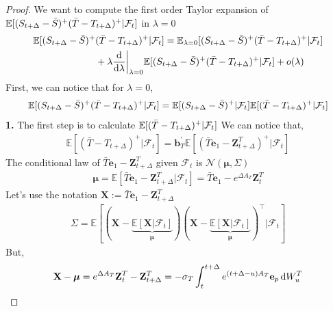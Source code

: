 \documentclass[10pt,a4paper,reqno]{amsart}
\theoremstyle{example}
\newcommand*\D{\mathop{}\!\textnormal{d}}
\newcommand{\opb}{\mathbf{b}}
\newcommand{\opZ}{\mathbf{Z}}
\newcommand{\ME}{\mathbb{E}}
\newcommand{\cF}{\mathcal{F}}
\begin{document}
\begin{proof}
We want to compute the first order Taylor expansion of $\mathbb{E}[(S_{t+\Delta}-\Bar{S})^+(\Bar{T}-T_{t+\Delta})^+ | \mathcal{F}_t]$ in $\lambda=0$
\begin{align}
    \mathbb{E}[(S_{t+\Delta}-\Bar{S})^+&(\Bar{T}-T_{t+\Delta})^+ | \mathcal{F}_t] = \mathbb{E}_{\lambda=0}[(S_{t+\Delta}-\Bar{S})^+(\Bar{T}-T_{t+\Delta})^+ | \mathcal{F}_t]\nonumber\\
    &+\lambda \frac{\D }{\D \lambda}\bigg|_{\lambda=0} \mathbb{E}[(S_{t+\Delta}-\Bar{S})^+(\Bar{T}-T_{t+\Delta})^+ | \mathcal{F}_t] + o(\lambda)\nonumber
\end{align}
\noindent
First, we can notice that for $\lambda = 0$,
\begin{align}
\mathbb{E}[(S_{t+\Delta}-\Bar{S})^+(\Bar{T}-T_{t+\Delta})^+ | \mathcal{F}_t]=\mathbb{E}[(S_{t+\Delta}-\Bar{S})^+| \mathcal{F}_t]\mathbb{E}[(\Bar{T}-T_{t+\Delta})^+ | \mathcal{F}_t]\nonumber
\end{align}
\newline\newline
\textbf{1.} The first step is to calculate $\mathbb{E}[(\Bar{T}-T_{t+\Delta})^+ | \mathcal{F}_t]$
\newline\newline
We can notice that,
\begin{align}
    \ME[(\bar{T}-T_{t+\Delta})^+|\cF_t] = \opb_T^{'}\ME[(\bar{T}\textbf{e}_1-\opZ_{t+\Delta}^T)^+|\cF_t]\nonumber
\end{align}
\noindent
The conditional law of $\bar{T}\textbf{e}_1-\textbf{Z}_{t+\Delta}^T$ given $\mathcal{F}_t$ is $\mathcal{N}(\boldsymbol\mu,\Sigma)$
\begin{align}
    \boldsymbol\mu=\ME[\bar{T}\textbf{e}_1-\textbf{Z}_{t+\Delta}^T|\mathcal{F}_t]=\bar{T}\textbf{e}_1-e^{\Delta A_T}\textbf{Z}_t^T
\end{align}
\noindent
Let's use the notation $\textbf{X}:=\bar{T}\textbf{e}_1-\textbf{Z}_{t+\Delta}^T$
\begin{align}
    \Sigma=\ME[(\textbf{X}-\underbrace{\ME[\textbf{X}|\mathcal{F}_t]}_{\boldsymbol{\mu}})(\textbf{X}-\underbrace{\ME[\textbf{X}|\mathcal{F}_t]}_{\boldsymbol{\mu}})^\intercal|\mathcal{F}_t]\nonumber
\end{align}
\noindent
But,
\begin{align}
  \mathbf{X}-\boldsymbol{\mu}=e^{\Delta A_T}\textbf{Z}_t^T-\mathbf{Z}_{t+\Delta}^T=-\sigma_T\int_t^{t+\Delta}e^{(t+\Delta-u)A_T}\textbf{e}_p\D W_u^T\nonumber  
\end{align}

\end{proof}
\end{document}
